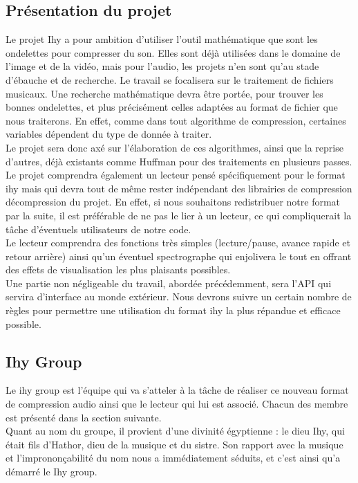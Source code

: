 	\subsection{Présentation du projet}
Le projet Ihy  a pour ambition d'utiliser l'outil  mathématique que sont
les ondelettes pour  compresser du son.  Elles sont  déjà utilisées dans
le domaine de  l'image et de la vidéo,  mais  pour l'audio,  les projets
n'en  sont  qu'au  stade  d'ébauche  et  de  recherche.  Le  travail  se
focalisera  sur  le  traitement  de  fichiers  musicaux.  Une  recherche
mathématique devra être portée,  pour trouver les bonnes ondelettes,  et
plus  précisément  celles  adaptées  au   format  de  fichier  que  nous
traiterons.  En  effet,  comme  dans  tout  algorithme  de  compression,
certaines variables dépendent du type de donnée à traiter.\\
Le projet sera donc axé sur l'élaboration de ces algorithmes,  ainsi que
la reprise d'autres,  déjà existants  comme Huffman pour des traitements
en plusieurs passes.\\
Le projet comprendra  également un lecteur pensé  spécifiquement pour le
format ihy mais qui devra tout de même rester indépendant des librairies
de compression  décompression du projet.  En  effet,  si nous souhaitons
redistribuer notre format par la suite,  il  est préférable de ne pas le
lier  à   un  lecteur,   ce  qui  compliquerait   la  tâche  d'éventuels
utilisateurs de notre code.\\
Le lecteur comprendra des fonctions très simples (lecture/pause,  avance
rapide  et  retour  arrière)  ainsi  qu'un  éventuel  spectrographe  qui
enjolivera le tout  en  offrant  des  effets  de  visualisation les plus
plaisants possibles.\\
Une partie non négligeable du travail,  abordée précédemment, sera l'API
qui servira  d'interface  au  monde  extérieur.  Nous  devrons suivre un
certain nombre de règles pour permettre une utilisation du format ihy la
plus répandue et efficace possible.

	\subsection{Ihy Group}
Le ihy  group est l'équipe  qui va s'atteler  à la tâche  de réaliser ce
nouveau format  de compression audio ainsi  que le  lecteur qui  lui est
associé.  Chacun des membre est présenté dans la section suivante.\\
Quant au nom du groupe,  il provient d'une divinité égyptienne : le dieu
Ihy,  qui était  fils d'Hathor,  dieu de  la musique et  du sistre.  Son
rapport  avec   la  musique   et  l'imprononçabilité   du  nom   nous  a
immédiatement séduits, et c'est ainsi qu'a démarré le Ihy group.

